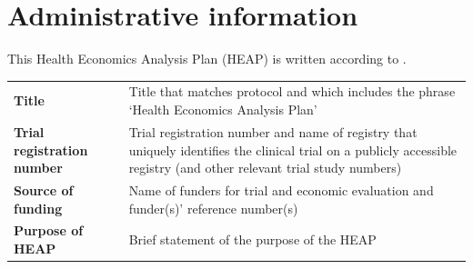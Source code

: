 \section{Administrative information}
This Health Economics Analysis Plan (HEAP) is written according to
\cite{thorn2021heap}.


\begin{table}
  \centering
  \begin{tabular}{ll}
    \hline
    \textbf{Title} &
                     Title that matches protocol and which includes the phrase ‘Health Economics
                     Analysis Plan'
    \\
    \textbf{Trial registration number} &
                                         Trial registration number and name of registry that
                                         uniquely identifies the clinical trial on a publicly
                                         accessible registry (and other relevant trial study numbers)
    \\
    \textbf{Source of funding} &
                                 Name of funders for trial and economic evaluation and funder(s)’ reference number(s)
    \\
    \textbf{Purpose of HEAP} &
                               Brief statement of the purpose of the HEAP


\end{tabular}
\end{table}
